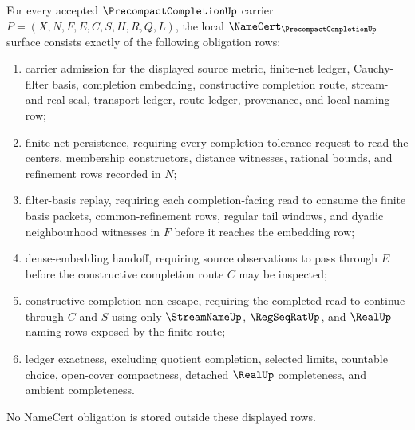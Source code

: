 \begin{theorem}
\label{thm:precompact-completion-namecert-obligations}
For every accepted $\PrecompactCompletionUp$ carrier
$P=(X,N,F,E,C,S,H,R,Q,L)$, the local $\NameCert_{\PrecompactCompletionUp}$ surface consists exactly of the following obligation rows:
\begin{enumerate}
\item carrier admission for the displayed source metric, finite-net ledger, Cauchy-filter basis, completion embedding, constructive completion route, stream-and-real seal, transport ledger, route ledger, provenance, and local naming row;
\item finite-net persistence, requiring every completion tolerance request to read the centers, membership constructors, distance witnesses, rational bounds, and refinement rows recorded in $N$;
\item filter-basis replay, requiring each completion-facing read to consume the finite basis packets, common-refinement rows, regular tail windows, and dyadic neighbourhood witnesses in $F$ before it reaches the embedding row;
\item dense-embedding handoff, requiring source observations to pass through $E$ before the constructive completion route $C$ may be inspected;
\item constructive-completion non-escape, requiring the completed read to continue through $C$ and $S$ using only $\StreamNameUp$, $\RegSeqRatUp$, and $\RealUp$ naming rows exposed by the finite route;
\item ledger exactness, excluding quotient completion, selected limits, countable choice, open-cover compactness, detached $\RealUp$ completeness, and ambient completeness.
\end{enumerate}
No NameCert obligation is stored outside these displayed rows.
\end{theorem}

